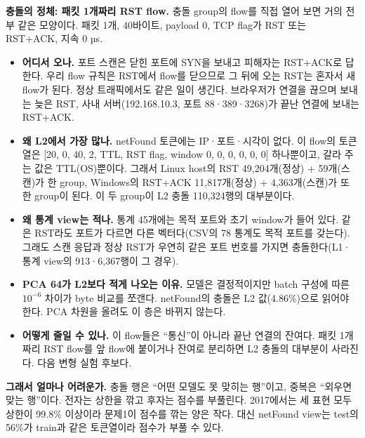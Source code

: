 \textbf{충돌의 정체: 패킷 1개짜리 RST flow.} 충돌 group의 flow를 직접 열어 보면 거의 전부 같은 모양이다. 패킷 1개, 40바이트, payload 0, TCP flag가 RST 또는 RST+ACK, 지속 0 µs.
\begin{itemize}
\item \textbf{어디서 오나.} 포트 스캔은 닫힌 포트에 SYN을 보내고 피해자는 RST+ACK로 답한다. 우리 flow 규칙은 RST에서 flow를 닫으므로 그 뒤에 오는 RST는 혼자서 새 flow가 된다. 정상 트래픽에서도 같은 일이 생긴다. 브라우저가 연결을 끊으며 보내는 늦은 RST, 사내 서버(192.168.10.3, 포트 88·389·3268)가 끝난 연결에 보내는 RST+ACK.
\item \textbf{왜 L2에서 가장 많나.} netFound 토큰에는 IP·포트·시각이 없다. 이 flow의 토큰열은 [20, 0, 40, 2, TTL, RST flag, window 0, 0, 0, 0, 0, 0] 하나뿐이고, 갈라 주는 값은 TTL(OS)뿐이다. 그래서 Linux host의 RST 49,204개(정상) + 59개(스캔)가 한 group, Windows의 RST+ACK 11,817개(정상) + 4,363개(스캔)가 또 한 group이 된다. 이 두 group이 L2 충돌 110,324행의 대부분이다.
\item \textbf{왜 통계 view는 적나.} 통계 45개에는 목적 포트와 초기 window가 들어 있다. 같은 RST라도 포트가 다르면 다른 벡터다(CSV의 78 통계도 목적 포트를 갖는다). 그래도 스캔 응답과 정상 RST가 우연히 같은 포트 번호를 가지면 충돌한다(L1·통계 view의 913·6,367행이 그 경우).
\item \textbf{PCA 64가 L2보다 적게 나오는 이유.} 모델은 결정적이지만 batch 구성에 따른 $10^{-6}$ 차이가 byte 비교를 쪼갠다. netFound의 충돌은 L2 값(4.86\%)으로 읽어야 한다. PCA 차원을 올려도 이 층은 바뀌지 않는다.
\item \textbf{어떻게 줄일 수 있나.} 이 flow들은 ``통신''이 아니라 끝난 연결의 잔여다. 패킷 1개짜리 RST flow를 앞 flow에 붙이거나 잔여로 분리하면 L2 충돌의 대부분이 사라진다. 다음 변형 실험 후보다.
\end{itemize}

\textbf{그래서 얼마나 어려운가.} 충돌 행은 ``어떤 모델도 못 맞히는 행''이고, 중복은 ``외우면 맞는 행''이다. 전자는 상한을 깎고 후자는 점수를 부풀린다. 2017에서는 세 표현 모두 상한이 99.8\% 이상이라 문제1이 점수를 깎는 양은 작다. 대신 netFound view는 test의 56\%가 train과 같은 토큰열이라 점수가 부풀 수 있다.


